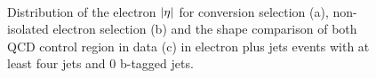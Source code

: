 \begin{figure}[hbtp]
  \begin{center}
  	\hfill
	 \\
    \caption{Distribution of the electron $\lvert \eta \rvert$ for conversion selection (a), non-isolated electron selection
    (b) and the shape comparison of both QCD control region in data (c) in electron plus jets events with at least
    four jets and 0 b-tagged jets.}
    \label{fig:qcd_control_regions_eta}
  \end{center}
\end{figure}

